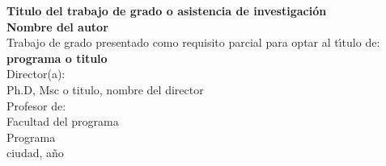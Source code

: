 \begin{center}
\thispagestyle{empty} \vspace*{1cm}
\textbf{\LARGE
Titulo del trabajo de grado o asistencia de investigación}\\[3.0cm]
\Large\textbf{Nombre del autor}\\[3.0cm]
\small Trabajo de grado presentado como requisito parcial para optar al
t\'{\i}tulo de:\\
\textbf{programa o titulo}\\[2.5cm]
Director(a):\\
Ph.D, Msc o titulo, nombre del director\\
Profesor de:\\\vfill
Facultad del programa\\
Programa \\
ciudad, año\\
\end{center}